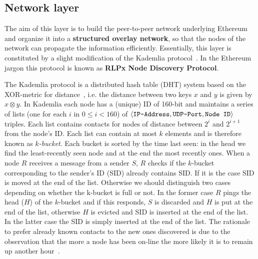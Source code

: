 \subsection{Network layer}
\label{sec:network-layer}

The aim of this layer is to build the peer-to-peer network underlying Ethereum
and organize it into a \textbf{structured overlay network}, so that the nodes
of the network can propagate the information efficiently.
Essentially, this layer is constituted by a slight modification of the 
Kademlia protocol~\cite{bib:discovery-protocol}.
In the Ethereum jargon this protocol is known as \textbf{RLPx Node Discovery
Protocol}.

The Kademlia protocol is a distributed hash table (DHT) system
based on the XOR-metric for
distance~\cite{bib:kademlia}, i.e. the distance between two keys $x$ and $y$ is 
given by $x \otimes y$.
In Kademlia each node has a (unique) ID of 160-bit and maintains a
series of lists (one for each $i$ in $0 \leq i < 160$) of
$\langle \verb|IP-Address|, \verb|UDP-Port|, \verb|Node ID| \rangle$ triples.
Each list contains contacts for nodes of distance between $2^i$ and $2^{i+1}$
from the node's ID.
Each list can contain at most $k$ elements and is therefore known as
\textit{$k$-bucket}.
Each bucket is sorted by the time last
seen: in the head we find the least-recently seen node and at the end the most
recently ones.
When a node $R$ receives a message from a sender $S$, $R$ checks if the
$k$-bucket corresponding to the sender's ID (SID) already contains SID.
If it is the case SID is moved at the end of the list. Otherwise we should
distinguish two cases depending on whether the k-bucket is full or not.
In the former case $R$ pings the head ($H$) of the $k$-bucket and if
this responds, $S$ is discarded and $H$ is put at the end of the list,
otherwise $H$ is evicted and SID is inserted at the end of the list.
In the latter case the SID is simply inserted at the end of the list.
The rationale to prefer already known contacts to the new ones discovered
is due to the observation that the more a node has been on-line the more
likely it is to remain up another hour~\cite{bib:kademlia}.

